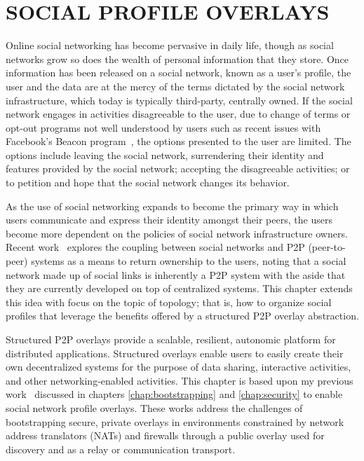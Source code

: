 \chapter{SOCIAL PROFILE OVERLAYS}
\label{chap:spo}

Online social networking has become pervasive in daily life, though as social
networks grow so does the wealth of personal information that they store.  Once
information has been released on a social network, known as a user's profile,
the user and the data are at the mercy of the terms dictated by the social
network infrastructure, which today is typically third-party, centrally owned.
If the social network engages in activities disagreeable to the user, due to
change of terms or opt-out programs not well understood by users such as recent
issues with Facebook's Beacon program~\cite{facebook_beacon}, the options
presented to the user are limited.  The options include leaving the social
network, surrendering their identity and features provided by the social
network; accepting the disagreeable activities; or to petition and hope that
the social network changes its behavior. 

As the use of social networking expands to become the primary way in which
users communicate and express their identity amongst their peers, the users
become more dependent on the policies of social network infrastructure owners.
Recent work~\cite{p2p_socialnetwork} explores the coupling between social
networks and P2P (peer-to-peer) systems as a means to return ownership to the
users, noting that a social network made up of social links is inherently a P2P
system with the aside that they are currently developed on top of centralized
systems.  This chapter extends this idea with focus on the topic of topology;
that is, how to organize social profiles that leverage the benefits offered by
a structured P2P overlay abstraction.

Structured P2P overlays provide a scalable, resilient, autonomic platform for
distributed applications.  Structured overlays enable users to easily create
their own decentralized systems for the purpose of data sharing, interactive
activities, and other networking-enabled activities.  This chapter is based
upon my previous work~\cite{groupvpn, bootstrapping} discussed in chapters
\ref{chap:bootstrapping} and \ref{chap:security} to enable social network
profile overlays.  These works address the challenges of bootstrapping secure,
private overlays in environments constrained by network address translators
(NATs) and firewalls through a public overlay used for discovery and as a relay
or communication transport.  

